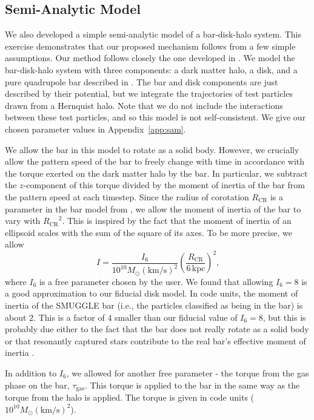 \documentclass[twocolumn,linenumbers,trackchanges]{aastex631}
\newcommand{\RCR}{\ensuremath{R_{\textrm{CR}}}}
\newcommand{\kms}{\ensuremath{\textrm{km}/\textrm{s}}}
\newcommand{\SMUGGLE}{SMUGGLE}
\newcommand{\Msun}{\ensuremath{M_{\odot}}}
\begin{document}
\subsection{Semi-Analytic Model}
We also developed a simple semi-analytic model of a bar-disk-halo system. This
exercise demonstrates that our proposed mechanism follows from a few simple
assumptions. Our method follows closely the one developed in
\citet{2022MNRAS.513..768C}. We model the bar-disk-halo system with three
components: a dark matter \citet{1990ApJ...356..359H} halo, a
\citet{1975PASJ...27..533M} disk, and a pure quadrupole bar
described in \citet{2022MNRAS.513..768C}. The bar and disk components are just
described by their potential, but we integrate the trajectories of test
particles drawn from a Hernquist halo. Note that we do not include the
interactions between these test particles, and so this model is not
self-consistent. We give our chosen parameter values in Appendix~\ref{app:sam}.

We allow the bar in this model to rotate as a solid body. However, we crucially
allow the pattern speed of the bar to freely change with time in accordance with
the torque exerted on the dark matter halo by the bar. In particular, we
subtract the $z$-component of this torque divided by the moment of inertia of
the bar from the pattern speed at each timestep. Since the radius of corotation
\RCR{} is a parameter in the bar model from \citet{2022MNRAS.513..768C}, we
allow the moment of inertia of the bar to vary with ${\RCR}^2$. This is
inspired by the fact that the moment of inertia of an ellipsoid scales with the
sum of the square of its axes. To be more precise, we allow
\begin{equation}
I = \frac{I_6}{10^{10} \Msun (\kms)^2} \left( \frac{\RCR}{6\,\textrm{kpc}} \right)^2\textrm{,}
\end{equation}
where $I_6$ is a free parameter chosen by the user. We found that allowing
$I_6=8$ is a good approximation to our fiducial disk model. In code units, the
moment of inertia of the \SMUGGLE{} bar (i.e., the particles classified as being in
the bar) is about $2$. This is a factor of $4$ smaller than our fiducial value
of $I_6=8$, but this is probably due either to the fact that the bar does not
really rotate as a solid body or that resonantly captured stars contribute to
the real bar's effective moment of inertia \citep{1985MNRAS.213..451W}.

In addition to $I_6$, we allowed for another free parameter - the torque from
the gas phase on the bar, $\tau_{\textrm{gas}}$. This torque is applied to the
bar in the same way as the torque from the halo is applied. The torque is given
in code units ($10^{10}\Msun \left(\kms\right)^2$).
\end{document}
